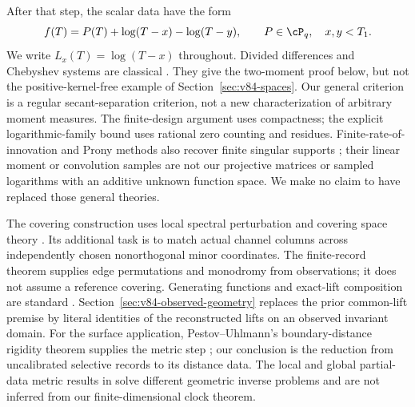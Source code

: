 After that step, the scalar data have the form
\begin{equation}\label{eq:v83-scalar}
 f(T)=P(T)+\log(T-x)-\log(T-y),\qquad P\in\cP_q,
 \quad x,y<T_1.
\end{equation}
We write $L_x(T)=\log(T-x)$ throughout.
Divided differences and Chebyshev systems are classical
\cite{V83deBoor,V83KS}. They give the two-moment proof below, but not
the positive-kernel-free example of Section~\ref{sec:v84-spaces}.
Our general criterion is a regular secant-separation criterion, not a
new characterization of arbitrary moment measures. The finite-design
argument uses compactness; the explicit logarithmic-family bound uses
rational zero counting and residues. Finite-rate-of-innovation and
Prony methods also recover finite singular supports
\cite{V84VMB,V84BY}; their linear moment or convolution samples are not
our projective matrices or sampled logarithms with an additive unknown
function space. We make no claim to have replaced those general theories.

The covering construction uses local spectral perturbation and covering
space theory \cite{V84Kato,V84Hatcher}. Its additional task is to match
actual channel columns across independently chosen nonorthogonal minor
coordinates. The finite-record theorem supplies edge permutations and
monodromy from observations; it does not assume a reference covering.
Generating functions and exact-lift composition are standard
\cite{V83MW,V83Geiges}. Section~\ref{sec:v84-observed-geometry} replaces
the prior common-lift premise by literal identities of the reconstructed
lifts on an observed invariant domain. For the surface application,
Pestov--Uhlmann's boundary-distance rigidity theorem supplies the metric
step \cite{V84PU}; our conclusion is the reduction from uncalibrated
selective records to its distance data. The local and global partial-data
metric results in \cite{V84SUV} solve different geometric inverse
problems and are not inferred from our finite-dimensional clock theorem.

